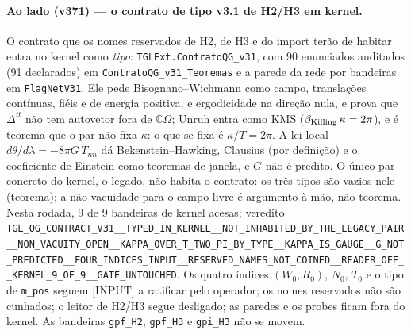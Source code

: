 \documentclass[11pt]{article}
\theoremstyle{definition}\newtheorem{deriv}{Derivação}
\begin{document}
\paragraph*{Ao lado (v371) --- o contrato de tipo v3.1 de H2/H3 em kernel.} O contrato que os nomes reservados de H2, de H3 e do import terão de habitar entra no kernel como \emph{tipo}: \texttt{TGLExt.ContratoQG\_v31}, com 90 enunciados auditados (91 declarados) em \texttt{ContratoQG\_v31\_Teoremas} e a parede da rede por bandeiras em \texttt{FlagNetV31}. Ele pede Bisognano--Wichmann como campo, translações contínuas, fiéis e de energia positiva, e ergodicidade na direção nula, e prova que $\Delta^{it}$ não tem autovetor fora de $\mathbb{C}\Omega$; Unruh entra como KMS ($\beta_{\rm Killing}\,\kappa=2\pi$), e é teorema que o par não fixa $\kappa$: o que se fixa é $\kappa/T=2\pi$. A lei local $d\theta/d\lambda=-8\pi G\,T_{nn}$ dá Bekenstein--Hawking, Clausius (por definição) e o coeficiente de Einstein como teoremas de janela, e $G$ não é predito. O único par concreto do kernel, o legado, não habita o contrato: os três tipos são vazios nele (teorema); a não-vacuidade para o campo livre é argumento à mão, não teorema. Nesta rodada, 9 de 9 bandeiras de kernel acesas; veredito \texttt{TGL\_QG\_CONTRACT\_V31\_\_TYPED\_IN\_KERNEL\_\_NOT\_INHABITED\_BY\_THE\_LEGACY\_PAIR\_\_NON\_VACUITY\_OPEN\_\_KAPPA\_OVER\_T\_TWO\_PI\_BY\_TYPE\_\_KAPPA\_IS\_GAUGE\_\_G\_NOT\_PREDICTED\_\_FOUR\_INDICES\_INPUT\_\_RESERVED\_NAMES\_NOT\_COINED\_\_READER\_OFF\_\_KERNEL\_9\_OF\_9\_\_GATE\_UNTOUCHED}. Os quatro índices $(W_0,R_0)$, $N_0$, $T_0$ e o tipo de \texttt{m\_pos} seguem [INPUT] a ratificar pelo operador; os nomes reservados não são cunhados; o leitor de H2/H3 segue desligado; as paredes e os probes ficam fora do kernel. As bandeiras \texttt{gpf\_H2}, \texttt{gpf\_H3} e \texttt{gpi\_H3} não se movem.
\end{document}
